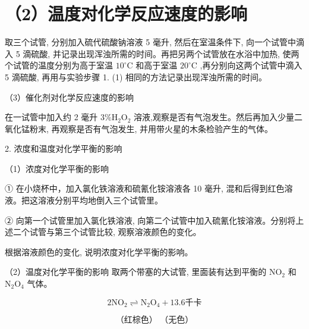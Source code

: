 \documentclass[10pt]{article}
\begin{document}
\section*{（2）温度对化学反应速度的影响}

取三个试管, 分别加入硫代硫酸钠溶液 5 毫升, 然后在室温条件下, 向一个试管中滴入 5 滴硫酸, 并记录出现浑浊所需的时间。再把另两个试管放在水浴中加热, 使两个试管的温度分别为高于室温 \({10}^{ \circ }\mathrm{C}\) 和高于室温 \({20}^{ \circ }\mathrm{C}\) ,再分别向这两个试管中滴入 5 滴硫酸, 再用与实验步骤 1. (1) 相同的方法记录出现浑浊所需的时间。

\begin{center}
\end{center}

（3）催化剂对化学反应速度的影响

在一试管中加入约 2 毫升 \(3\% {\mathrm{H}}_{2}{\mathrm{O}}_{2}\) 溶液,观察是否有气泡发生。然后再加入少量二氧化锰粉末, 再观察是否有气泡发生, 并用带火星的木条检验产生的气体。

2. 浓度和温度对化学平衡的影响

（1）浓度对化学平衡的影响

① 在小烧杯中，加入氯化铁溶液和硫氰化铵溶液各 10 毫升, 混和后得到红色溶液。把这溶液分别平均地倒入三个试管里。

② 向第一个试管里加入氯化铁溶液, 向第二个试管中加入硫氰化铵溶液。分别将上述二个试管与第三个试管比较, 观察溶液颜色的变化。

根据溶液颜色的变化, 说明浓度对化学平衡的影响。

（2）温度对化学平衡的影响 取两个带塞的大试管, 里面装有达到平衡的 \({\mathrm{{NO}}}_{2}\) 和 \({\mathrm{N}}_{2}{\mathrm{O}}_{4}\) 气体。

\[
2{\mathrm{{NO}}}_{2} \rightleftharpoons {\mathrm{N}}_{2}{\mathrm{O}}_{4} + {13.6}\text{千卡}
\]

\[
\text{（红棕色） （无色）}
\]
\end{document}
